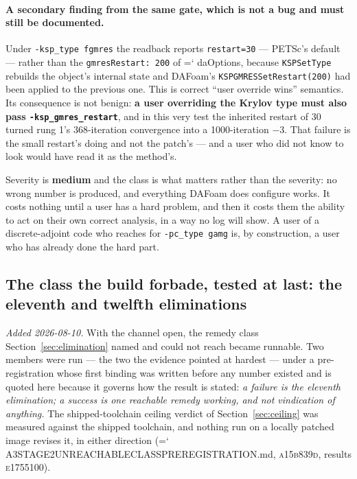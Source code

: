 \documentclass[11pt,a4paper]{article}
\newcommand{\artifact}[1]{{\small\ttfamily\hyphenchar\font=`\-\relax
  \def\_{\textunderscore\allowbreak}#1}}
\newcommand{\commit}[1]{\textsc{\small #1}}
\begin{document}
\paragraph{A secondary finding from the same gate, which is not a bug and must still be
documented.} Under \texttt{-ksp\_type fgmres} the readback reports \texttt{restart=30} --- PETSc's
default --- rather than the \texttt{gmresRestart: 200} of \artifact{daOptions}, because
\texttt{KSPSetType} rebuilds the object's internal state and DAFoam's
\texttt{KSPGMRESSetRestart(200)} had been applied to the previous one. This is correct ``user
override wins'' semantics. Its consequence is not benign: \textbf{a user overriding the Krylov
type must also pass \texttt{-ksp\_gmres\_restart}}, and in this very test the inherited restart of
30 turned rung 1's 368-iteration convergence into a 1000-iteration \(-3\). That failure is the
small restart's doing and not the patch's --- and a user who did not know to look would have read
it as the method's.

Severity is \textbf{medium} and the class is what matters rather than the severity: no wrong
number is produced, and everything DAFoam does configure works. It costs nothing until a user
has a hard problem, and then it costs them the ability to act on their own correct analysis, in
a way no log will show. A user of a discrete-adjoint code who reaches for \texttt{-pc\_type
gamg} is, by construction, a user who has already done the hard part.

\subsection{The class the build forbade, tested at last: the eleventh and twelfth eliminations}
\label{sec:stage2}

\emph{Added 2026-08-10.} With the channel open, the remedy class Section~\ref{sec:elimination}
named and could not reach became runnable. Two members were run --- the two the evidence pointed
at hardest --- under a pre-registration whose first binding was written before any number existed
and is quoted here because it governs how the result is stated: \emph{a failure is the eleventh
elimination; a success is one reachable remedy working, and not vindication of anything.} The
shipped-toolchain ceiling verdict of Section~\ref{sec:ceiling} was measured against the shipped
toolchain, and nothing run on a locally patched image revises it, in either direction
(\artifact{A3\_STAGE2\_UNREACHABLE\_CLASS\_PREREGISTRATION.md}, \commit{a15b839d}, results
\commit{e1755100}).
\end{document}
